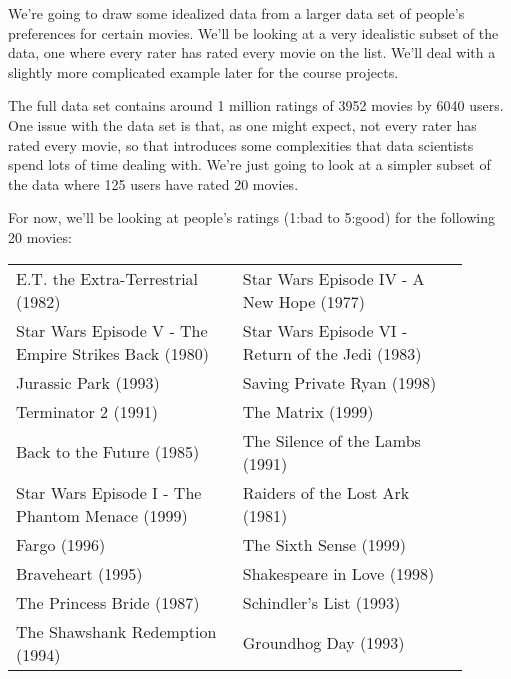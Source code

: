 \documentclass{ximera}
\begin{document}
\begin{exploration}

  We're going to draw some idealized data from a larger data set of people's preferences for certain movies. We'll be looking at a very idealistic subset of the data, one where every rater has rated every movie on the list. We'll deal with a slightly more complicated example later for the course projects. 

  The full data set contains around 1 million ratings of 3952 movies by 6040 users. One issue with the data set is that, as one might expect, not every rater has rated every movie, so that introduces some complexities that data scientists spend lots of time dealing with. We're just going to look at a simpler subset of the data where 125 users have rated 20 movies.

  For now, we'll be looking at people's ratings (1:bad to 5:good) for the following 20 movies:

  \vspace{1em}

  \begin{small} %
    \begin{tabular}{p{0.45\linewidth} p{0.45\linewidth}} %
      E.T. the Extra-Terrestrial (1982) & Star Wars Episode IV - A New Hope (1977) \\
      Star Wars Episode V - The Empire Strikes Back (1980) & Star Wars Episode VI - Return of the Jedi (1983) \\
      Jurassic Park (1993) & Saving Private Ryan (1998) \\
      Terminator 2 (1991) & The Matrix (1999) \\
      Back to the Future (1985) & The Silence of the Lambs (1991) \\
      Star Wars Episode I - The Phantom Menace (1999) & Raiders of the Lost Ark (1981) \\
      Fargo (1996) & The Sixth Sense (1999) \\
      Braveheart (1995) & Shakespeare in Love (1998) \\
      The Princess Bride (1987) & Schindler's List (1993) \\
      The Shawshank Redemption (1994) & Groundhog Day (1993) \\
    \end{tabular}
    \end{small}


\end{exploration}
\end{document}
